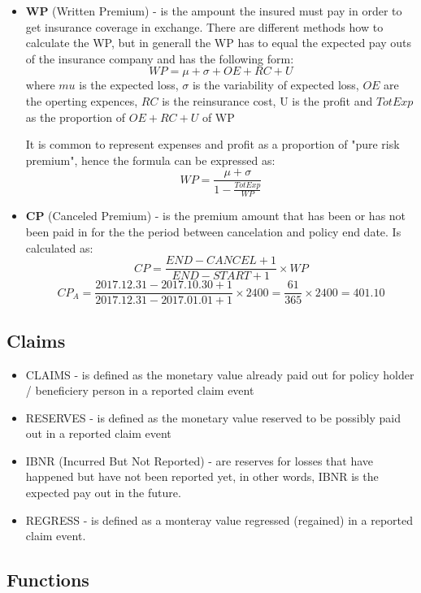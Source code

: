 \documentclass[11pt,a4paper,fleqn]{article}      %
\begin{document}
\begin{itemize}
\item \textbf{WP} (Written Premium) - is the ampount the insured must pay in order to get insurance coverage in exchange. There are different methods how to calculate the WP, but in generall the WP has to equal the expected pay outs of the insurance company and has the following form:
$$WP=\mu + \sigma +OE +RC+U$$ 
where $mu$ is the expected loss, $\sigma$ is the variability of expected loss, $OE$ are the operting expences, $RC$ is the reinsurance cost, U is the profit and $TotExp$ as the proportion of $OE+RC+U$ of WP

It is common to represent expenses and profit as a proportion of "pure risk premium", hence the formula can be expressed as:
$$WP=\frac{\mu + \sigma}{1-\frac{TotExp}{WP}}$$ 




\item \textbf{CP} (Canceled Premium) - is the premium amount that has been or has not been paid in for the the period between cancelation and policy end date. Is calculated as: 
$$CP=\frac{END-CANCEL+1}{END-START+1} \times WP $$
$$CP_A=\frac{2017.12.31-2017.10.30+1}{2017.12.31-2017.01.01+1} \times 2400=  \frac{61}{365} \times 2400=401.10 $$


\end{itemize}

\subsection{Claims}

\begin{itemize}
\item CLAIMS - is defined as the monetary value already paid out for policy holder / beneficiery person in a reported claim event
\item RESERVES - is defined as the monetary value reserved to be possibly paid out in a reported claim event
\item IBNR (Incurred But Not Reported) - are reserves for losses that have happened but have not been reported yet, in other words, IBNR is the expected pay out in the future.
\item REGRESS - is defined as a monteray value regressed (regained) in a reported claim event.
\end{itemize}

\subsection{Functions}
\label{sec:funct}
\end{document}
